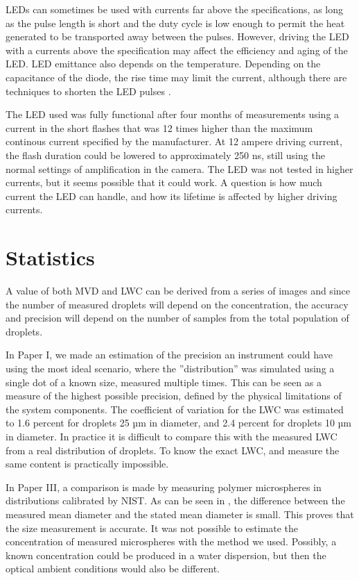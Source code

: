 LEDs can sometimes be used with currents far above the specifications, as long as the pulse length is short and the duty cycle is low enough to permit the heat generated to be transported away between the pulses. However, driving the LED with a currents above the specification may affect the efficiency and aging of the LED. LED emittance also depends on the temperature. Depending on the capacitance of the diode, the rise time may limit the current, although there are techniques to shorten the LED pulses \cite{tanaka2011,vele2007}.

The LED used was fully functional after four months of measurements using a current in the short flashes that was 12 times higher than the maximum continous current specified by the manufacturer. At 12 ampere driving current, the flash duration could be lowered to approximately 250 ns, still using the normal settings of amplification in the camera. The LED was not tested in higher currents, but it seems possible that it could work. A question is how much current the LED can handle, and how its lifetime is affected by higher driving currents.

\section{Statistics}

A value of both MVD and LWC can be derived from a series of images and since the number of measured droplets will depend on the concentration, the accuracy and precision will depend on the number of samples from the total population of droplets. 

In Paper I, we made an estimation of the precision an instrument could have using the most ideal scenario, where the ''distribution'' was simulated using a single dot of a known size, measured multiple times. This can be seen as a measure of the highest possible precision, defined by the physical limitations of the system components. The coefficient of variation for the LWC was estimated to 1.6 percent for droplets 25 µm in diameter, and 2.4 percent for droplets 10 µm in diameter. In practice it is difficult to compare this with the measured LWC from a real  distribution of droplets. To know the exact LWC, and measure the same content is practically impossible. 

In Paper III, a comparison is made by measuring polymer microspheres in distributions calibrated by NIST. As can be seen in , the difference between the measured mean diameter and the stated mean diameter is small. This proves that the size measurement is accurate. It was not possible to estimate the concentration of measured microspheres with the method we used. Possibly, a known concentration could be produced in a water dispersion, but then the optical ambient conditions would also be different.


